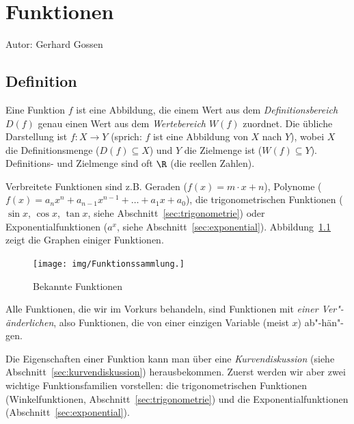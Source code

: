 \newcommand{\pitwo}{\frac{\pi}{2}}
\newcommand{\newpar}{\vspace{1em}\noindent}

\chapter{Funktionen}
\label{chap:funktionen}

Autor: Gerhard Gossen

\mbox{}\par
\section{Definition}
\noindent Eine Funktion $f$ ist eine Abbildung, die einem Wert aus dem \emph{Definitionsbereich $D(f)$} genau einen Wert aus dem \emph{Wertebereich $W(f)$} zuordnet. Die übliche Darstellung ist
$f : X \to Y$ (sprich: $f$ ist eine Abbildung von $X$ nach $Y$), wobei $X$ die Definitionsmenge ($D(f) \subseteq X$) und $Y$ die Zielmenge ist ($W(f) \subseteq Y$). Definitions- und Zielmenge sind oft $\R$ (die reellen Zahlen).

Verbreitete Funktionen sind z.B. Geraden ($f(x) = m\cdot x +n$), Polynome ($f(x) = a_n x^n + a_{n-1} x^{n-1}+\dots + a_1x+a_0$), die trigonometrischen Funktionen ($\sin x$, $\cos x$, $\tan x$, siehe Abschnitt~\ref{sec:trigonometrie}) oder Exponentialfunktionen ($a^x$, siehe Abschnitt~\ref{sec:exponential}). Abbildung~\ref{fig:funktionen} zeigt die Graphen einiger Funktionen.

\begin{figure}[bth]
\begin{center}
    \texttt{[image: img/Funktionssammlung.]}
\end{center}
\caption{Bekannte Funktionen}
\label{fig:funktionen}
\end{figure} 

Alle Funktionen, die wir im Vorkurs behandeln, sind Funktionen mit \emph{einer Ver"-änderlichen}, also Funktionen, die von einer einzigen Variable (meist $x$) ab"-hän"-gen. %

Die Eigenschaften einer Funktion kann man über eine \emph{Kurvendiskussion} (siehe Abschnitt~\ref{sec:kurvendiskussion}) herausbekommen. Zuerst werden wir aber zwei wichtige Funktionsfamilien vorstellen: die trigonometrischen Funktionen (Winkelfunktionen, Abschnitt~\ref{sec:trigonometrie}) und die Exponentialfunktionen (Abschnitt~\ref{sec:exponential}).

